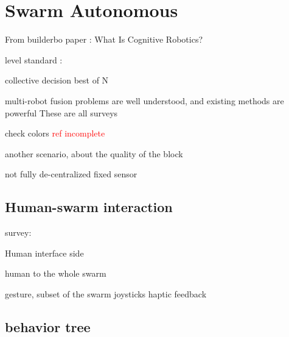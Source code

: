 \section{Swarm Autonomous}

From builderbo paper :
What Is Cognitive Robotics?
\cite{cangelosi2022cognition} 
\cite{vernon2014artificial} 
\cite{heinrich2022swarm}
\cite{khaluf2019neglected}

level standard :
\cite{sae2021automated}

collective decision
\cite{valentini2017best} best of N
\cite{dorigo2014self}
\cite{valentini2016collective}

multi-robot fusion problems are well understood, and existing methods are powerful
These are all surveys
\cite{yan2013survey} 
\cite{sun2017multi}
\cite{rizk2019cooperative}
\cite{li2021multi}

check colors
\cite{strobel2018managing} \textcolor{red}{ref incomplete}
\cite{ebert2018multi}
\cite{shan2020collective}
\cite{bartashevich2019benchmarking}
\cite{shan2021discrete}

another scenario, about the quality of the block
\cite{prasetyo2018best}
\cite{prasetyo2019collective}
\cite{khaluf2017edge} 
\cite{wahby2019collective}
\cite{khaluf2020construction}
\cite{capitan2013decentralized}

not fully de-centralized
\cite{mirzaei2007performance} fixed sensor
\cite{rodrigues2015beyond}
\cite{stroupe2001distributed}
\cite{zadorozhny2013information}
\cite{sasaoka2016multi}
\cite{czarnetzki2010handling}
\cite{otte2016collective}
\cite{kornienko2005cognitive}
\cite{giusti2012cooperative}

\subsection{Human-swarm interaction}

survey:
\cite{siean2023opportunities}
\cite{kolling2015human}

Human interface side
\cite{jarvis2025first}
\cite{abioye2025user}
\cite{alonso2015gesture}

human to the whole swarm
\cite{ayanian2014controlling}
\cite{alonso2015gesture}
\cite{macchini2021personalized}

\cite{podevijn2013gesturing} gesture, subset of the swarm
\cite{zhou2016assistive} joysticks
\cite{lee2013semiautonomous} haptic feedback

\cite{kolling2013human}


\subsection{behavior tree}

